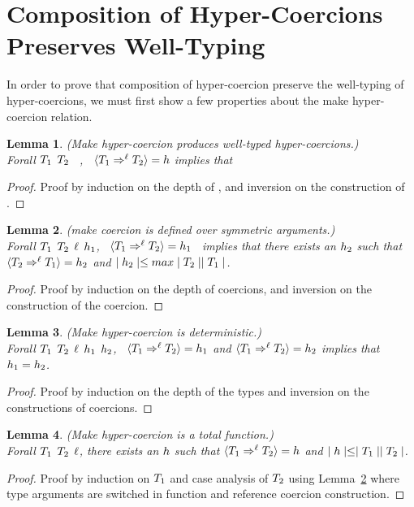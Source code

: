 \documentclass[acmtog, authorversion, acmlarge]{acmart}
\newtheorem{lem}{Lemma}
\begin{document}
\clearpage

\section{Composition of Hyper-Coercions Preserves Well-Typing}

In order to prove that composition of hyper-coercion preserve
the well-typing of hyper-coercions, we must first show a
few properties about the make hyper-coercion relation. 

\begin{lem}
  \label{lem:mk_hc_wt}
  (Make hyper-coercion produces well-typed hyper-coercions.)\\
  Forall $T_1$ $T_2$ \Lbl \, \HC, \,
  $\langle T_1 \Rightarrow^{\ell} T_2 \rangle = h$ implies that 
\end{lem}
\begin{proof}
  Proof by induction on the depth of \HC, and inversion
  on the construction of \HC. 
\end{proof}

\begin{lem}
  \label{lem:mk_hc_sym}
  (make coercion is defined over symmetric arguments.)\\
  Forall $T_1$ $T_2$ $\ell$ $h_1$, \,
  $\langle T_1 \Rightarrow^{\ell} T_2 \rangle = h_1$ \, implies that
  there exists an $h_2$ such that
  $\langle T_2 \Rightarrow^{\ell} T_1 \rangle = h_2$ and
  $\mid h_2 \mid \le max \mid T_2 \mid \mid T_1 \mid$.
\end{lem}
\begin{proof}
  Proof by induction on the depth of coercions, and inversion
  on the construction of the coercion. 
\end{proof}

\begin{lem}
  \label{lem:mk_hc_fn}
  (Make hyper-coercion is deterministic.)\\
  Forall $T_1$ $T_2$ $\ell$ $h_1$ $h_2$, \,
  $\langle T_1 \Rightarrow^{\ell} T_2 \rangle = h_1$ and
  $\langle T_1 \Rightarrow^{\ell} T_2 \rangle = h_2$ implies that
  $h_1 = h_2$.
\end{lem}
\begin{proof}
  Proof by induction on the depth of the types and
  inversion on the constructions of coercions. 
\end{proof}

\begin{lem}
  \label{lem:mk_hc_tot}
  (Make hyper-coercion is a total function.)\\
  Forall $T_1$ $T_2$ $\ell$,
  there exists an $h$ such that
  $\langle T_1 \Rightarrow^{\ell} T_2 \rangle = h$ and
  $\mid h \mid \le \mid T_1 \mid \mid T_2 \mid$.
\end{lem}
\begin{proof}
  Proof by induction on $T_1$ and case analysis of $T_2$
  using Lemma~\ref{lem:mk_hc_sym} where type arguments
  are switched in function and reference coercion construction. 
\end{proof}
\end{document}
